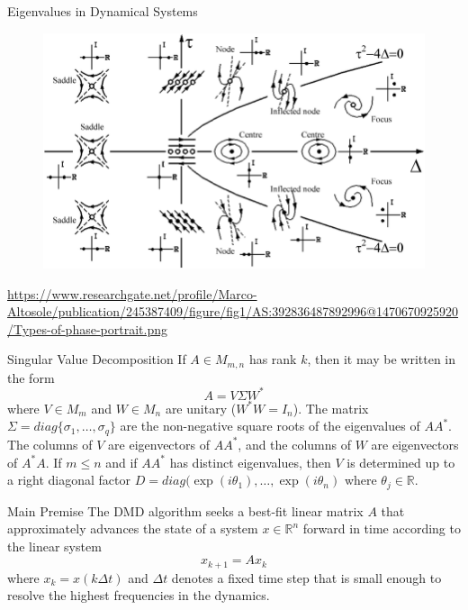 \documentclass{beamer}
\begin{document}
	\begin{frame}{Eigenvalues in Dynamical Systems}
		\begin{figure}[h]
	\centering
		\includegraphics[scale=0.3]{../Figures/fig_phase_portrait.png}
\end{figure}
\url{https://www.researchgate.net/profile/Marco-Altosole/publication/245387409/figure/fig1/AS:392836487892996@1470670925920/Types-of-phase-portrait.png}		
	\end{frame}

\begin{frame}{Singular Value Decomposition}
	If $A \in M_{m,n}$ has rank $k$, then it may be written in the form 
	\begin{equation*}
	A=V \Sigma W^*
	\end{equation*}
where $V\in M_m$ and $W\in M_n$ are unitary ($W^* W=I_n$). The matrix $\Sigma=diag\{\sigma_1,\ldots, \sigma_q\}$ are the non-negative square roots of the eigenvalues of $AA^*$. The columns of $V$ are eigenvectors of $AA^*$, and the columns of $W$ are eigenvectors of $A^* A$. If $m\le n$ and if $AA^*$ has distinct eigenvalues, then $V$ is determined up to a right diagonal factor $D=diag( \exp(i\theta_1), \ldots, \exp(i \theta_n)$ where $\theta_j \in \mathbb{R}$. 
\end{frame}

\begin{frame}{Main Premise}
	The DMD algorithm seeks a best-fit linear matrix $A$ that approximately advances the state of a system $x\in \mathbb{R}^n$ forward in time according to the linear system
	\begin{equation*}
		x_{k+1}= A x_k
	\end{equation*}
where $x_k= x(k\Delta t)$ and $\Delta t$ denotes a fixed time step that is small enough to resolve the highest frequencies in the dynamics.
\end{frame}
\end{document}
